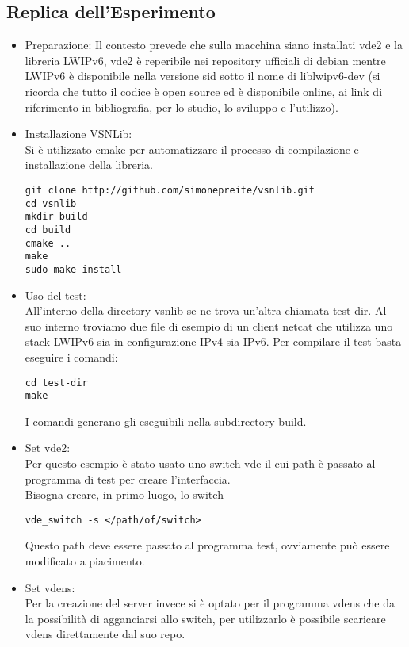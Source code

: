 \subsection{Replica dell'Esperimento}
\begin{itemize}
  \item Preparazione: Il contesto prevede che sulla macchina siano installati vde2 e la libreria LWIPv6, vde2 \`e reperibile nei repository ufficiali di debian mentre LWIPv6 \`e disponibile nella versione sid sotto il nome di liblwipv6-dev (si ricorda che tutto il codice \`e open source ed \`e disponibile online, ai link di riferimento in bibliografia, per lo studio, lo sviluppo e l'utilizzo).\\
  \item Installazione VSNLib:\\
  Si \`e utilizzato cmake per automatizzare il processo di compilazione e installazione della libreria.
  \begin{lstlisting}[language=Bashn]
git clone http://github.com/simonepreite/vsnlib.git
cd vsnlib
mkdir build
cd build
cmake ..
make
sudo make install
\end{lstlisting}
  \item Uso del test:\\
  All'interno della directory vsnlib se ne trova un'altra chiamata test-dir. Al suo interno troviamo due file di esempio di un client netcat che utilizza uno stack LWIPv6 sia in configurazione IPv4 sia IPv6. Per compilare il test basta eseguire i comandi:
  \begin{lstlisting}[language=Bashn]
cd test-dir
make
\end{lstlisting}
  I comandi generano gli eseguibili nella subdirectory build.
  \item Set vde2:\\
  Per questo esempio \`e stato usato uno switch vde il cui path \`e passato al programma di test per creare l'interfaccia.\\
  Bisogna creare, in primo luogo, lo switch
  \begin{lstlisting}[language=Bashn]
vde_switch -s </path/of/switch>
\end{lstlisting}
  Questo path deve essere passato al programma test, ovviamente pu\`o essere modificato a piacimento.\\
\item Set vdens:\\
  Per la creazione del server invece si \`e optato per il programma vdens che da la possibilit\`a di agganciarsi allo switch, per utilizzarlo \`e possibile scaricare vdens direttamente dal suo repo\cite{K16}.\\

\end{itemize}
